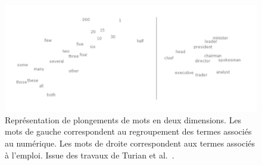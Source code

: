 \begin{figure}[h]
  \centering
  \includegraphics[width=14cm]{./Chapitre3/figures/word2vec.png}
  \caption{Représentation de plongements de mots en deux dimensions. Les mots de gauche correspondent au regroupement des termes associés au numérique. Les mots de droite correspondent aux termes associés à l'emploi. Issue des travaux de Turian et al.~\cite{Turian2010}.}
  \label{fig:word2vec}
\end{figure}
